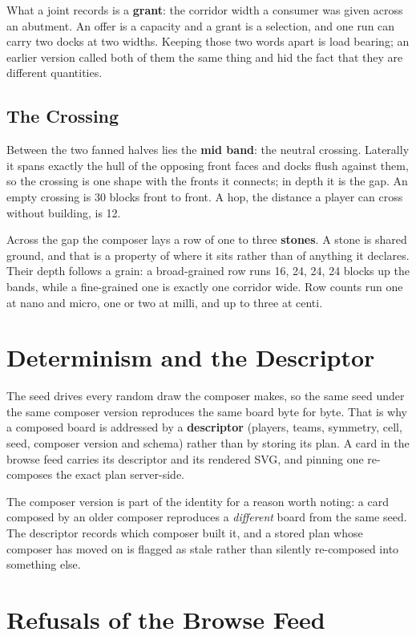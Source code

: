 What a joint records is a \textbf{grant}: the corridor width a consumer was given
across an abutment. An offer is a capacity and a grant is a selection, and
one run can carry two docks at two widths. Keeping those two words apart is load
bearing; an earlier version called both of them the same thing and hid the fact
that they are different quantities.

\subsection{The Crossing}

Between the two fanned halves lies the \textbf{mid band}: the neutral crossing.
Laterally it spans exactly the hull of the opposing front faces and docks flush
against them, so the crossing is one shape with the fronts it connects; in depth
it is the gap. An empty crossing is 30 blocks front to front. A hop, the distance
a player can cross without building, is 12.

Across the gap the composer lays a row of one to three \textbf{stones}. A stone is
shared ground, and that is a property of where it sits rather than of anything it
declares. Their depth follows a grain: a broad-grained row runs 16, 24, 24, 24
blocks up the bands, while a fine-grained one is exactly one corridor wide. Row
counts run one at nano and micro, one or two at milli, and up to three at centi.

\section{Determinism and the Descriptor}

The seed drives every random draw the composer makes, so the same seed under the
same composer version reproduces the same board byte for byte. That is why a
composed board is addressed by a \textbf{descriptor} (players, teams, symmetry,
cell, seed, composer version and schema) rather than by storing its plan. A card
in the browse feed carries its descriptor and its rendered SVG, and pinning one
re-composes the exact plan server-side.

The composer version is part of the identity for a reason worth noting: a card
composed by an older composer reproduces a \emph{different} board from the same
seed. The descriptor records which composer built it, and a stored plan whose
composer has moved on is flagged as stale rather than silently re-composed into
something else.

\section{Refusals of the Browse Feed}

